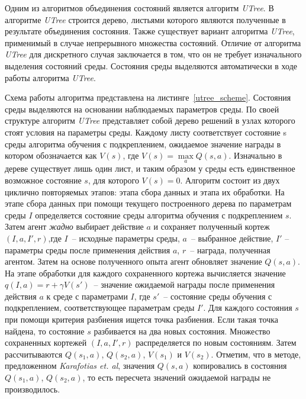 Одним из алгоритмов объединения состояний является алгоритм \textit{UTree}. В алгоритме \textit{UTree} строится дерево, листьями которого являются полученные в результате объединения состояния. Также существует вариант алгоритма \textit{UTree}, применимый в случае непрерывного множества состояний. Отличие от алгоритма \textit{UTree} для дискретного случая заключается в том, что он не требует изначального выделения состояний среды. Состояния среды выделяются автоматически в ходе работы алгоритма \textit{UTree}.

Схема работы алгоритма представлена на листинге~\ref{utree_scheme}. Состояния среды выделяются на основании наблюдаемых параметров среды. По своей структуре алгоритм \textit{UTree} представляет собой дерево решений в узлах которого стоят условия на параметры среды. Каждому листу соответствует состояние s среды алгоритма обучения с подкреплением, ожидаемое значение награды в котором обозначается как $V(s)$, где $V(s) = \max \limits_a Q(s,a)$. Изначально в дереве существует лишь один лист, и таким образом у среды есть единственное возможное состояние $s$, для которого $V(s) = 0$. Алгоритм состоит из двух циклично повторяемых этапов: этапа сбора данных и этапа их обработки. На этапе сбора данных при помощи текущего построенного дерева по параметрам среды $I$ определяется состояние среды алгоритма обучения с подкреплением $s$. Затем агент \textit{жадно} выбирает действие $a$ и сохраняет полученный кортеж $(I, a, I', r)$,где $I$~-- исходные параметры среды, $a$~-- выбранное действие, $I'$ -- параметры среды после применения действия $a$, $r$~-- награда, полученная агентом. Затем на основе полученного опыта агент обновляет значение $Q(s, a)$. На этапе обработки для каждого сохраненного кортежа вычисляется значение $q(I, a) =  r + \gamma V (s')$~-- значение ожидаемой награды после применения действия $a$ к среде с параметрами $I$, где $s'$~-- состояние среды обучения с подкреплением, соответствующее параметрам среды $I'$. Для каждого состояния $s$ при помощи критерия разбиения ищется точка разбиения. Если такая точка найдена, то состояние $s$ разбивается на два новых состояния. Множество сохраненных кортежей $(I, a, I', r)$ распределяется по новым состояниям. Затем рассчитываются $Q(s_1, a)$, $Q(s_2, a)$, $V(s_1)$ и $V(s_2)$. Отметим, что в методе, предложенном \textit{Karafotias et. al}, значения $Q(s, a)$ копировались в состояния $Q(s_1, a)$, $Q(s_2, a)$, то есть пересчета значений ожидаемой награды не производилось.

